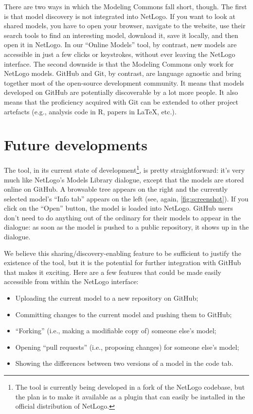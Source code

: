 \documentclass[runningheads]{llncs}
\begin{document}
There are two ways in which the Modeling Commons fall short, though. The first is that model discovery is not integrated into NetLogo. If you want to look at shared models, you have to open your browser, navigate to the website, use their search tools to find an interesting model, download it, save it locally, and then open it in NetLogo. In our ``Online Models'' tool, by contrast, new models are accessible in just a few clicks or keystrokes, without ever leaving the NetLogo interface. The second downside is that the Modeling Commons only work for NetLogo models. GitHub and Git, by contrast, are language agnostic and bring together most of the open-source development community. It means that models developed on GitHub are potentially discoverable by a lot more people. It also means that the proficiency acquired with Git can be extended to other project artefacts (e.g., analysis code in R, papers in \LaTeX, etc.).

\section{Future developments}

The tool, in its current state of development\footnote{The tool is currently being developed in a fork of the NetLogo codebase\cite{payette_netlogo_2018}, but the plan is to make it available as a plugin that can easily be installed in the official distribution of NetLogo.}, is pretty straightforward: it's very much like NetLogo's Models Library dialogue, except that the models are stored online on GitHub. A browsable tree appears on the right and the currently selected model's ``Info tab'' appears on the left (see, again, \cref{fig:screenshot}). If you click on the ``Open'' button, the model is loaded into NetLogo. GitHub users don't need to do anything out of the ordinary for their models to appear in the dialogue: as soon as the model is pushed to a public repository, it shows up in the dialogue.

We believe this sharing/discovery-enabling feature to be sufficient to justify the existence of the tool, but it is the potential for further integration with GitHub that makes it exciting. Here are a few features that could be made easily accessible from within the NetLogo interface:

\begin{itemize}
  \item Uploading the current model to a new repository on GitHub;
  \item Committing changes to the current model and pushing them to GitHub;
  \item ``Forking'' (i.e., making a modifiable copy of) someone else's model;
  \item Opening ``pull requests'' (i.e., proposing changes) for someone else's model;
  \item Showing the differences between two versions of a model in the code tab.
\end{itemize}
\end{document}
